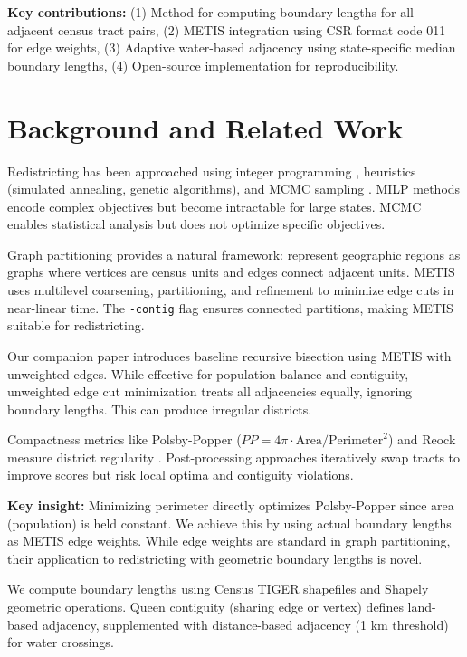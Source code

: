 \documentclass[11pt,twocolumn]{article}
\begin{document}
\textbf{Key contributions:} (1) Method for computing boundary lengths for all adjacent census tract pairs, (2) METIS integration using CSR format code 011 for edge weights, (3) Adaptive water-based adjacency using state-specific median boundary lengths, (4) Open-source implementation for reproducibility.

\section{Background and Related Work}

Redistricting has been approached using integer programming \cite{garfinkel1970optimal}, heuristics (simulated annealing, genetic algorithms), and MCMC sampling \cite{duchin2018outlier}. MILP methods encode complex objectives but become intractable for large states. MCMC enables statistical analysis but does not optimize specific objectives.

Graph partitioning provides a natural framework: represent geographic regions as graphs where vertices are census units and edges connect adjacent units. METIS \cite{karypis1998metis} uses multilevel coarsening, partitioning, and refinement to minimize edge cuts in near-linear time. The \texttt{-contig} flag ensures connected partitions, making METIS suitable for redistricting.

Our companion paper \cite{TODO-paper1} introduces baseline recursive bisection using METIS with unweighted edges. While effective for population balance and contiguity, unweighted edge cut minimization treats all adjacencies equally, ignoring boundary lengths. This can produce irregular districts.

Compactness metrics like Polsby-Popper ($PP = 4\pi \cdot \text{Area}/\text{Perimeter}^2$) and Reock measure district regularity \cite{polsby1991third,reock1961measuring}. Post-processing approaches iteratively swap tracts to improve scores but risk local optima and contiguity violations.

\textbf{Key insight:} Minimizing perimeter directly optimizes Polsby-Popper since area (population) is held constant. We achieve this by using actual boundary lengths as METIS edge weights. While edge weights are standard in graph partitioning, their application to redistricting with geometric boundary lengths is novel.

We compute boundary lengths using Census TIGER shapefiles \cite{tiger-census} and Shapely geometric operations. Queen contiguity (sharing edge or vertex) defines land-based adjacency, supplemented with distance-based adjacency (1 km threshold) for water crossings.
\end{document}
